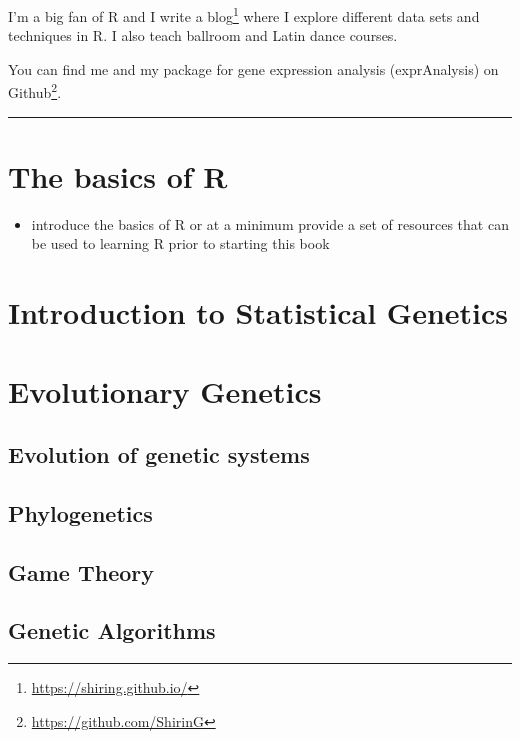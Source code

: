 \documentclass[12pt,]{krantz}
\providecommand{\tightlist}{%
  \setlength{\itemsep}{0pt}\setlength{\parskip}{0pt}}
\renewcommand{\href}[2]{#2\footnote{\url{#1}}}
\begin{document}
I'm a big fan of R and I write \href{https://shiring.github.io/}{a blog}
where I explore different data sets and techniques in R. I also teach
ballroom and Latin dance courses.

You can find me and my package for gene expression analysis
(exprAnalysis) on \href{https://github.com/ShirinG}{Github}.

\begin{center}\rule{0.5\linewidth}{\linethickness}\end{center}

\chapter*{The basics of R}\label{the-basics-of-r}


\begin{itemize}
\tightlist
\item
  introduce the basics of R or at a minimum provide a set of resources
  that can be used to learning R prior to starting this book
\end{itemize}

\mainmatter

\chapter{Introduction to Statistical
Genetics}\label{introduction-to-statistical-genetics}

\chapter{Evolutionary Genetics}\label{evolutionary-genetics}

\section{Evolution of genetic
systems}\label{evolution-of-genetic-systems}

\section{Phylogenetics}\label{phylogenetics}

\section{Game Theory}\label{game-theory}

\section{Genetic Algorithms}\label{genetic-algorithms}
\end{document}
